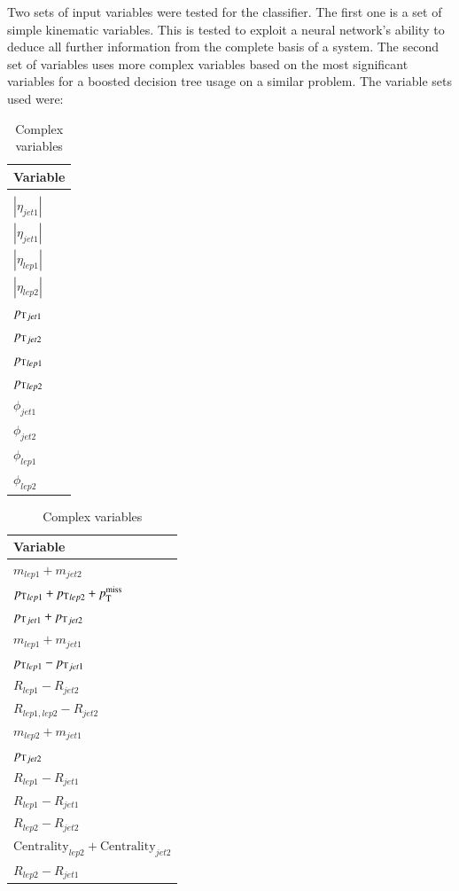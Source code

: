 Two sets of input variables were tested for the classifier.
The first one is a set of simple kinematic variables. This is tested to exploit a neural network's ability to deduce all further information from the complete basis of a system.
The second set of variables uses more complex variables based on the most significant variables for a boosted decision tree usage on a similar problem.
The variable sets used were:
%
%
%
\begin{table}[h]
    \begin{minipage}{.5\linewidth}
      \centering
		\begin{tabular}{l}
		Variable         \\ \hline
		\pTmiss          \\ \hline
		$|\eta_{jet1}|$  \\ \hline
		$|\eta_{jet1}|$  \\ \hline
		$|\eta_{lep1}|$  \\ \hline
		$|\eta_{lep2}|$  \\ \hline
		${p_{\text{T}}}_{jet1}$   \\ \hline
		${p_{\text{T}}}_{jet2}$   \\ \hline
		${p_{\text{T}}}_{lep1}$   \\ \hline
		${p_{\text{T}}}_{lep2}$   \\ \hline
		$\phi_{jet1}$    \\ \hline
		$\phi_{jet2}$    \\ \hline
		$\phi_{lep1}$    \\ \hline
		$\phi_{lep2}$    \\ \hline
		\end{tabular}
		\caption{Simple kinematic variables}
    \end{minipage}%
    \begin{minipage}{.5\linewidth}
      \centering
		\begin{tabular}{l}
		Variable                   \\ \hline
		$m_{lep1} + m_{jet2}$      \\ \hline
		${p_{\text{T}}}_{lep1} + {p_{\text{T}}}_{lep2} + p_{\text{T}}^{\text{miss}}     $     \\ \hline
		${p_{\text{T}}}_{jet1} + {p_{\text{T}}}_{jet2}    $     \\ \hline
		$m_{lep1} + m_{jet1}$      \\ \hline
		${p_{\text{T}}}_{lep1} - {p_{\text{T}}}_{jet1}$\\ \hline
		${R}_{lep1} - {R}_{jet2}$    \\ \hline
		$R_{lep1, lep2} - R_{jet2}$       \\ \hline
		$m_{lep2} + m_{jet1}$        \\ \hline
		${p_{\text{T}}}_{jet2}$               \\ \hline
		${R}_{lep1} - {R}_{jet1}$	 \\ \hline
		${R}_{lep1} - {R}_{jet1}$	 \\ \hline
		${R}_{lep2} - {R}_{jet2}$	 \\ \hline
		$\text{Centrality}_{lep2} + \text{Centrality}_{jet2}$ \\ \hline
		${R}_{lep2} - {R}_{jet1}$    \\ \hline
		\end{tabular}
		\caption{Complex variables}
    \end{minipage} 
\end{table}
